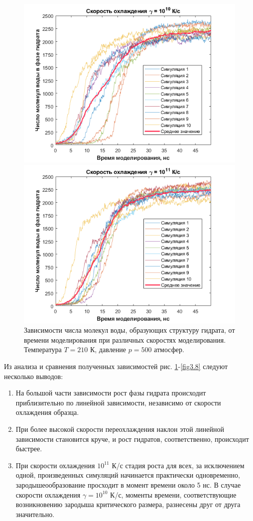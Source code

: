 \begin{figure}[H]
    \centering
    \begin{minipage}{\linewidth}
        \centering
        \includegraphics[width=.7\linewidth]{figures/bulk10.png}
    \end{minipage}
    \begin{minipage}{\linewidth}
        \centering
        \includegraphics[width=.7\linewidth]{figures/bulk11.png}
    \end{minipage}
    \caption{Зависимости числа молекул воды, образующих структуру гидрата, от времени моделирования при различных скоростях моделирования. Температура $T=210$ К, давление $p=500$ атмосфер.}
    \label{fig3.7}
\end{figure}

Из анализа и сравнения полученных зависимостей рис. \ref{fig3.7}-\ref{fig3.8} следуют несколько выводов:
\begin{enumerate}
    \item На большой части зависимости рост фазы гидрата происходит приблизительно по линейной зависимости, независимо от скорости охлаждения образца.
    \item При более высокой скорости переохлаждения наклон этой линейной зависимости становится круче, и рост гидратов, соответственно, происходит быстрее.
    \item При скорости охлаждения $10^{11}$ К/с стадия роста для всех, за исключением одной, произведенных симуляций начинается практически одновременно, зародышеообразование просходит в момент времени около 5 нс. В случае скорости охлаждения $\gamma=10^10$ К/с, моменты времени, соответствующие возникновению зародыша критического размера, разнесены друг от друга значительно.
\end{enumerate}

